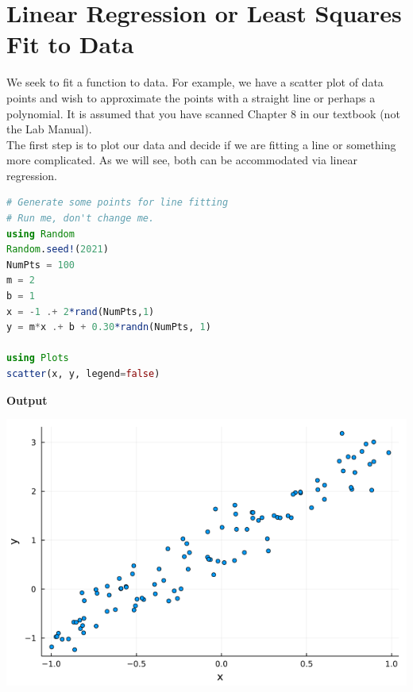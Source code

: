 
\section{Linear Regression or Least Squares Fit to Data}
\label{sec:LinearRegression}

We seek to fit a function to data. For example, we have a scatter plot of data points and wish to approximate the points with a straight line or perhaps a polynomial. It is assumed that you have scanned Chapter 8 in our textbook (not the Lab Manual).\\


 The first step is to plot our data and decide if we are fitting a line or something more complicated. As we will see, both can be accommodated via linear regression.

\begin{lstlisting}[language=Julia,style=mystyle]
# Generate some points for line fitting
# Run me, don't change me. 
using Random
Random.seed!(2021)
NumPts = 100
m = 2
b = 1
x = -1 .+ 2*rand(NumPts,1)
y = m*x .+ b + 0.30*randn(NumPts, 1)

using Plots
scatter(x, y, legend=false)
\end{lstlisting}
\textbf{Output} 

\includegraphics[width=0.6\columnwidth]{graphics/Chap06/LinearScatterPlot.png}

